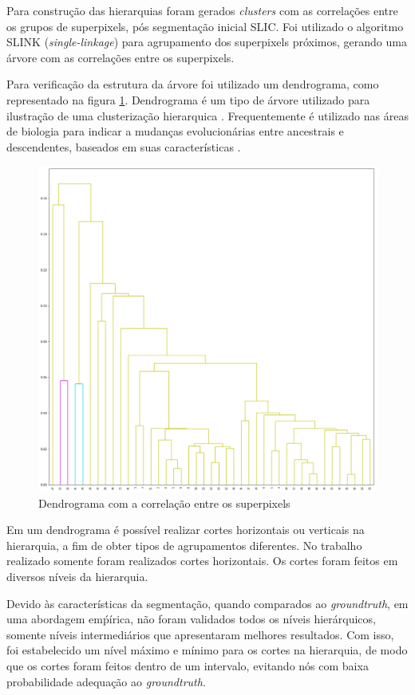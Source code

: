 \begin{document}
Para construção das hierarquias foram gerados \textit{clusters} com as correlações entre os grupos de superpixels, pós segmentação inicial SLIC. Foi utilizado o algoritmo SLINK (\textit{single-linkage}) para agrupamento dos superpixels próximos, gerando uma árvore com as correlações entre os superpixels.

Para verificação da estrutura da árvore foi utilizado um dendrograma, como representado na figura \ref{fig:DENDROGRAM}. Dendrograma é um tipo de árvore utilizado para ilustração de uma clusterização hierarquica \cite{WIKI_DENDROGRAM}. Frequentemente é utilizado nas áreas de biologia para indicar a mudanças evolucionárias entre ancestrais e descendentes, baseados em suas características \cite{DENDROGRAM}.

\begin{figure}[ht]
\centering
\includegraphics[width=1.\textwidth]{dendrogram.png}
\caption{Dendrograma com a correlação entre os superpixels}
\label{fig:DENDROGRAM}
\end{figure}

Em um dendrograma é possível realizar cortes horizontais ou verticais na hierarquia, a fim de obter tipos de agrupamentos diferentes. No trabalho realizado somente foram realizados cortes horizontais. Os cortes foram feitos em diversos níveis da hierarquia. 

Devido às características da segmentação, quando comparados ao \textit{groundtruth}, em uma abordagem emṕírica, não foram validados todos os níveis hierárquicos, somente níveis intermediários que apresentaram melhores resultados. Com isso, foi estabelecido um nível máximo e mínimo para os cortes na hierarquia, de modo que os cortes foram feitos dentro de um intervalo, evitando nós com baixa probabilidade adequação ao \textit{groundtruth}.
\end{document}
